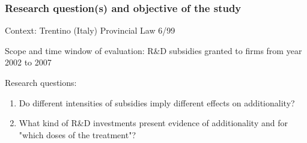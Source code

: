 \documentclass[10pt,handout,xcolor=pdftex,dvipsnames,table]{beamer}
\begin{document}
\begin{frame}
\frametitle{Research question(s) and objective of the study}
\begin{block} {Context: }Trentino (Italy) Provincial Law 6/99
\end{block}
\begin{block} {Scope and time window of evaluation:}  R\&D subsidies granted to firms from year 2002 to 2007
\end{block}

\begin{block} {Research questions:}
\begin{enumerate}
\item Do different intensities of subsidies imply different effects on additionality? 

\item What kind of R\&D investments present evidence of additionality and for "which doses of the treatment"?
\end{enumerate}
\end{block}


\end{frame}
\end{document}
